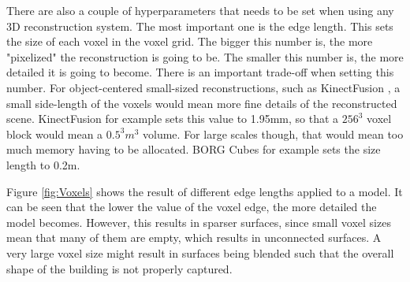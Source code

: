 \documentclass[12pt]{article}
\begin{document}
There are also a couple of hyperparameters that needs to be set when using any 3D reconstruction system. The most important one is the edge length. This sets the size of each voxel in the voxel grid. The bigger this number is, the more "pixelized" the reconstruction is going to be. The smaller this number is, the more detailed it is going to become. There is an important trade-off when setting this number. For object-centered small-sized reconstructions, such as KinectFusion \cite{kinectfusion}, a small side-length of the voxels would mean more fine details of the reconstructed scene. KinectFusion for example sets this value to	 1.95mm, so that a $256^3$ voxel block would mean a $0.5^3 m^3$ volume. For large scales though, that would mean too much memory having to be allocated. BORG Cubes for example sets the size length to 0.2m.
	
Figure \ref{fig:Voxels} shows the result of different edge lengths applied to a model. It can be seen that the lower the value of the voxel edge, the more detailed the model becomes. However, this results in sparser surfaces, since small voxel sizes mean that many of them are empty, which results in unconnected surfaces. A very large voxel size might result in surfaces being blended such that the overall shape of the building is not properly captured.
\end{document}
